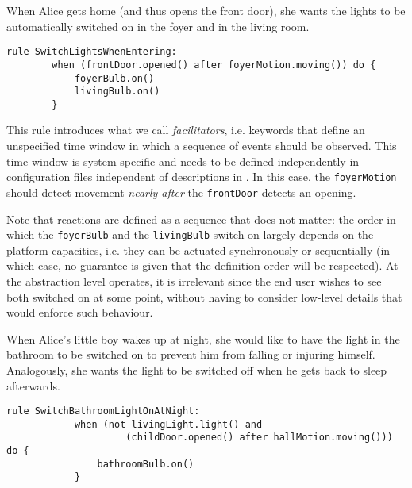\begin{description}[leftmargin=0cm]
	\item[Switching entrance lights on when coming in]  When Alice gets home (and thus opens the front door), she wants the lights to be automatically switched on in the foyer and in the living room.
	\begin{lstlisting}[language=iotdsl,
							label=lis:home-rule,
		caption=Rule to switch on the lights at home incoming]
	rule SwitchLightsWhenEntering:
		when (frontDoor.opened() after foyerMotion.moving()) do {
			foyerBulb.on() 
			livingBulb.on()
		}
	\end{lstlisting}
	This rule introduces what we call \emph{facilitators}, i.e. keywords that define an unspecified time window in which a sequence of events should be observed. This time window is system-specific and needs to be defined independently in configuration files independent of descriptions in \IOTDSL. In this case, the \lstinline[language=iotdsl]{foyerMotion} should detect movement \emph{nearly after} the \lstinline[language=iotdsl]{frontDoor} detects an opening. 
		
	Note that reactions are defined as a sequence that does not matter: the order in which the \lstinline[language=iotdsl]{foyerBulb} and the \lstinline[language=iotdsl]{livingBulb} switch on largely depends on the platform capacities, i.e. they can be actuated synchronously or sequentially (in which case, no guarantee is given that the definition order will be respected). At the abstraction level \IOTDSL operates, it is irrelevant since the end user wishes to see both switched on at some point, without having to consider low-level details that would enforce such behaviour.


	\item[Illuminate bathroom when children wake up at night] When Alice's little boy wakes up at night, she would like to have the light in the bathroom to be switched on to prevent him from falling or injuring himself. Analogously, she wants the light to be switched off when he gets back to sleep afterwards.
	\begin{lstlisting}[language=iotdsl,
							label=lis:night-rule,
		caption=Rules to switch on\//off lights in the corridor at night]
		rule SwitchBathroomLightOnAtNight:	
			when (not livingLight.light() and 
					 (childDoor.opened() after hallMotion.moving())) do {
				bathroomBulb.on()
			}
  

\end{lstlisting}
\end{description}
